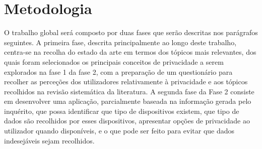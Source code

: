 \documentclass[conference]{IEEEtran}
\begin{document}

\section{Metodologia}

O trabalho global será composto por duas fases que serão descritas nos
parágrafos seguintes. A primeira fase, descrita principalmente ao longo
deste trabalho, centra-se na recolha do estado da arte em termos dos tópicos
mais relevantes, dos quais foram selecionados os principais conceitos de
privacidade a serem explorados na fase 1 da fase 2, com a preparação de
um questionário para recolher as perceções dos utilizadores relativamente
à privacidade e aos tópicos recolhidos na revisão sistemática da literatura.
A segunda fase da Fase 2 consiste em desenvolver uma aplicação, parcialmente
baseada na informação gerada pelo inquérito, que possa identificar que tipo
de dispositivos existem, que tipo de dados são recolhidos por esses
dispositivos, apresentar opções de privacidade ao utilizador quando
disponíveis, e o que pode ser feito para evitar que dados indesejáveis
sejam recolhidos.
\end{document}
